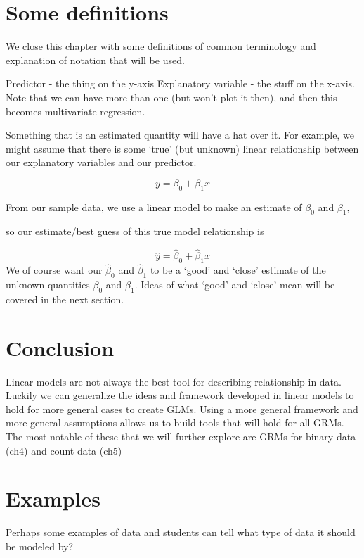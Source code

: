 \documentclass[
]{book}
\begin{document}
\hypertarget{definitions}{%
\section{Some definitions}\label{definitions}}

We close this chapter with some definitions of common terminology and explanation of notation that will be used.

Predictor - the thing on the y-axis
Explanatory variable - the stuff on the x-axis. Note that we can have more than one (but won't plot it then), and then this becomes multivariate regression.

Something that is an estimated quantity will have a hat over it.
For example, we might assume that there is some `true' (but unknown) linear relationship between our explanatory variables and our predictor.

\[ y = \beta_0 + \beta_1 x\]

From our sample data, we use a linear model to make an estimate of \(\beta_0\) and \(\beta_1\),

so our estimate/best guess of this true model relationship is

\[ \hat y = \hat\beta_0 + \hat\beta_1 x\]
We of course want our \(\hat\beta_0\) and \(\hat\beta_1\) to be a `good' and `close' estimate of the unknown quantities \(\beta_0\) and \(\beta_1\). Ideas of what `good' and `close' mean will be covered in the next section.

\hypertarget{conclusion}{%
\section{Conclusion}\label{conclusion}}

Linear models are not always the best tool for describing relationship in data. Luckily we can generalize the ideas and framework developed in linear models to hold for more general cases to create GLMs. Using a more general framework and more general assumptions allows us to build tools that will hold for all GRMs. The most notable of these that we will further explore are GRMs for binary data (ch4) and count data (ch5)

\hypertarget{examples}{%
\section{Examples}\label{examples}}

Perhaps some examples of data and students can tell what type of data it should be modeled by?
\end{document}
